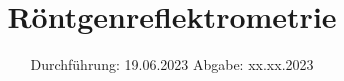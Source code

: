 

\subject{V44}
\title{Röntgenreflektrometrie}
\date{
  Durchführung: 19.06.2023
  \hspace{3em}
  Abgabe: xx.xx.2023
}
\usepackage[aux]{rerunfilecheck}

\usepackage{fontspec}
\usepackage{siunitx}

\usepackage[ngerman]{babel}

\usepackage[unicode]{hyperref}
\usepackage{bookmark}
\usepackage{booktabs}
\usepackage{import}
\usepackage{amsmath}

\usepackage{scrhack}

\usepackage[aux]{rerunfilecheck}

\usepackage{fontspec}

\usepackage[ngerman]{babel}

\usepackage{amsmath}
\usepackage{amssymb}
\usepackage{mathtools}

\usepackage{booktabs}

\usepackage[unicode]{hyperref}
\usepackage{bookmark}
\usepackage{svg}



\maketitle
\thispagestyle{empty}
\tableofcontents
\newpage










\nocite{*}
\printbibliography

\newpage
{}


